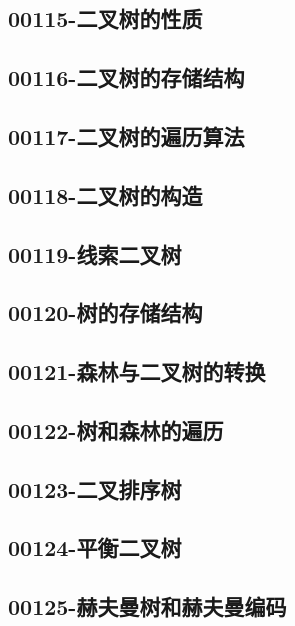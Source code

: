 \subsection{00115-二叉树的性质}

\subsection{00116-二叉树的存储结构}

\subsection{00117-二叉树的遍历算法}

\subsection{00118-二叉树的构造}

\subsection{00119-线索二叉树}

\subsection{00120-树的存储结构}

\subsection{00121-森林与二叉树的转换}

\subsection{00122-树和森林的遍历}

\subsection{00123-二叉排序树}

\subsection{00124-平衡二叉树}

\subsection{00125-赫夫曼树和赫夫曼编码}

